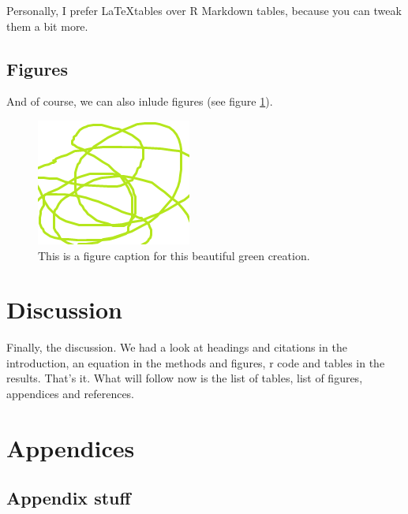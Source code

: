 \documentclass[
  12pt,
]{article}
\begin{document}
Personally, I prefer \LaTeX tables over R Markdown tables, because you
can tweak them a bit more.

\hypertarget{figures}{%
\subsection{Figures}\label{figures}}

And of course, we can also inlude figures (see figure
\ref{figurelabel}).

\begin{figure}
\centering
\includegraphics{figure1.png}
\caption{This is a figure caption for this beautiful green creation.
\label{figurelabel}}
\end{figure}

\FloatBarrier
\newpage
{}

\hypertarget{discussion}{%
\section{Discussion}\label{discussion}}

Finally, the discussion. We had a look at headings and citations in the
introduction, an equation in the methods and figures, r code and tables
in the results. That's it. What will follow now is the list of tables,
list of figures, appendices and references.

\FloatBarrier

\newpage
{}
\listoffigures

\newpage
{}
\listoftables

\newpage

\appendix
\section{Appendices}

\subsection{Appendix stuff}
\end{document}
